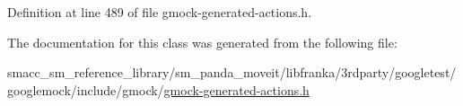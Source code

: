 Definition at line 489 of file gmock-\/generated-\/actions.\+h.



The documentation for this class was generated from the following file\+:\begin{DoxyCompactItemize}
\item 
smacc\+\_\+sm\+\_\+reference\+\_\+library/sm\+\_\+panda\+\_\+moveit/libfranka/3rdparty/googletest/googlemock/include/gmock/\hyperlink{gmock-generated-actions_8h}{gmock-\/generated-\/actions.\+h}\end{DoxyCompactItemize}
